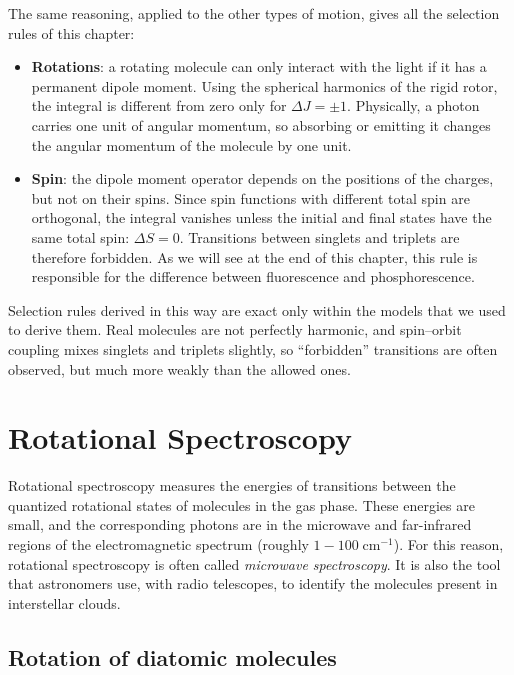 \documentclass[
  english,
  9pt,
]{extbook}
\providecommand{\tightlist}{%
  \setlength{\itemsep}{0pt}\setlength{\parskip}{0pt}}
\theoremstyle{definition}
\theoremstyle{definition}
\theoremstyle{definition}
\theoremstyle{definition}
\theoremstyle{remark}
\begin{document}
The same reasoning, applied to the other types of motion, gives all the selection rules of this chapter:

\begin{itemize}
\tightlist
\item
  \textbf{Rotations}: a rotating molecule can only interact with the light if it has a permanent dipole moment. Using the spherical harmonics of the rigid rotor, the integral is different from zero only for \(\Delta J=\pm1\). Physically, a photon carries one unit of angular momentum, so absorbing or emitting it changes the angular momentum of the molecule by one unit.
\item
  \textbf{Spin}: the dipole moment operator depends on the positions of the charges, but not on their spins. Since spin functions with different total spin are orthogonal, the integral vanishes unless the initial and final states have the same total spin: \(\Delta S=0\). Transitions between singlets and triplets are therefore forbidden. As we will see at the end of this chapter, this rule is responsible for the difference between fluorescence and phosphorescence.
\end{itemize}

Selection rules derived in this way are exact only within the models that we used to derive them. Real molecules are not perfectly harmonic, and spin--orbit coupling mixes singlets and triplets slightly, so ``forbidden'' transitions are often observed, but much more weakly than the allowed ones.

\section{Rotational Spectroscopy}\label{rotational-spectroscopy}

Rotational spectroscopy measures the energies of transitions between the quantized rotational states of molecules in the gas phase. These energies are small, and the corresponding photons are in the microwave and far-infrared regions of the electromagnetic spectrum (roughly \(1-100\; \text{cm}^{-1}\)). For this reason, rotational spectroscopy is often called \emph{microwave spectroscopy}. It is also the tool that astronomers use, with radio telescopes, to identify the molecules present in interstellar clouds.

\subsection{Rotation of diatomic molecules}\label{rotation-of-diatomic-molecules}
\end{document}
